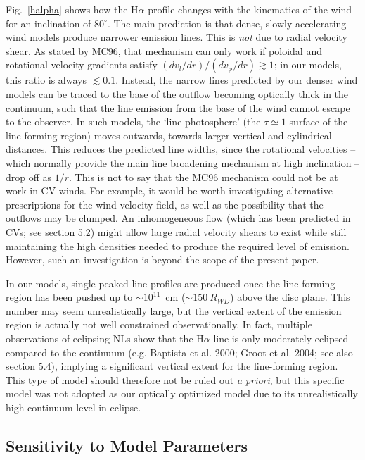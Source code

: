 Fig.~\ref{halpha} shows how the H$\alpha$ profile changes with the kinematics of the wind for 
an inclination of $80^\circ$. The main prediction is that dense, slowly accelerating 
wind models produce narrower emission lines. This is {\em not} due to radial 
velocity shear. As stated by MC96, that mechanism can only work if poloidal 
and rotational velocity gradients satisfy $(dv_l/dr)/(dv_\phi/dr) \gtrsim 1$; in 
our models, this ratio is always $\lesssim 0.1$. Instead, the narrow lines predicted 
by our denser wind models can be traced to the base of the outflow becoming optically 
thick in the continuum, such that the line emission from the base of the wind
cannot escape to the observer. In such models, the `line photosphere'
(the $\tau \simeq 1$ surface of the line-forming region) moves outwards, towards larger 
vertical and cylindrical distances. This reduces the predicted line widths, since the 
rotational velocities -- which normally provide the main line broadening mechanism at 
high inclination -- drop off as $1/r$. This is not to say that the MC96 
mechanism could not be at work in CV winds. For example, it would be worth investigating
alternative prescriptions for the wind velocity field, as well as the possibility that the 
outflows may be clumped. An inhomogeneous flow 
(which has been predicted in CVs; see section 5.2)
might allow large radial velocity shears to exist while still 
maintaining the high densities needed to produce the required level of emission.
However, such an investigation is beyond the scope of the present paper.

In our models, single-peaked line profiles are produced once the line forming region has been
pushed up to $\sim 10^{11}$~cm ($\sim150~R_{WD}$) above the disc plane. 
This number may seem unrealistically large, but the vertical extent of 
the emission region is actually not well constrained observationally. 
In fact, multiple observations of eclipsing NLs show that the H$\alpha$ 
line is only moderately eclipsed compared to the continuum (e.g. Baptista et al. 2000;
Groot et al. 2004; see also section 5.4), 
implying a significant vertical extent for the line-forming 
region. This type of model should therefore not be ruled out {\em a priori}, 
but this specific model was not adopted as our optically optimized model
due to its unrealistically high continuum level in eclipse. 

\subsection{Sensitivity to Model Parameters}

